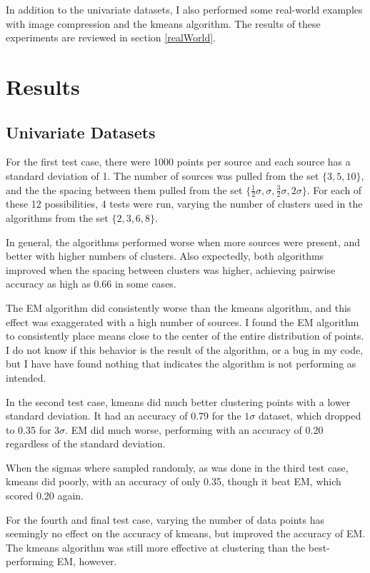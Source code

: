 \documentclass[a4paper]{article}
\begin{document}
In addition to the univariate datasets, I also performed some real-world examples with image compression and the kmeans algorithm. The results of these experiments are reviewed in section \ref{realWorld}. 

\section{Results}

\subsection{Univariate Datasets}

For the first test case, there were 1000 points per source and each source has a standard deviation of 1. The number of sources was pulled from the set $\{3,5,10\}$, and the the spacing between them pulled from the set $\{\frac{1}{2}\sigma, \sigma, \frac{3}{2}\sigma, 2\sigma\}$. For each of these 12 possibilities, 4 tests were run, varying the number of clusters used in the algorithms from the set $\{2,3,6,8\}$.

In general, the algorithms performed worse when more sources were present, and better with higher numbers of clusters. Also expectedly, both algorithms improved when the spacing between clusters was higher, achieving pairwise accuracy as high as 0.66 in some cases.

The EM algorithm did consistently worse than the kmeans algorithm, and this effect was exaggerated with a high number of sources. I found the EM algorithm to consistently place means close to the center of the entire distribution of points. I do not know if this behavior is the result of the algorithm, or a bug in my code, but I have have found nothing that indicates the algorithm is not performing as intended.

In the second test case, kmeans did much better clustering points with a lower standard deviation. It had an accuracy of 0.79 for the $1\sigma$ dataset, which dropped to 0.35 for $3\sigma$. EM did much worse, performing with an accuracy of 0.20 regardless of the standard deviation.

When the sigmas where sampled randomly, as was done in the third test case, kmeans did poorly, with an accuracy of only 0.35, though it beat EM, which scored 0.20 again.

For the fourth and final test case, varying the number of data points has seemingly no effect on the accuracy of kmeans, but improved the accuracy of EM. The kmeans algorithm was still more effective at clustering than the best-performing EM, however.
\end{document}
